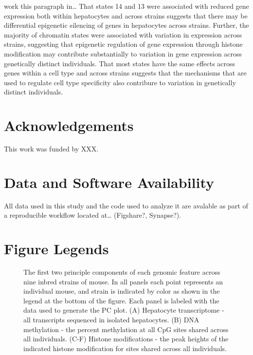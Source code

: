 \documentclass[10pt,letterpaper]{article}
\begin{document}
work this paragraph in\ldots{} That states 14 and 13 were associated
with reduced gene expression both within hepatocytes and across strains
suggests that there may be differential epigenetic silencing of genes in
hepatocytes across strains. Further, the majority of chromatin states
were associated with variation in expression across strains, suggesting
that epigenetic regulation of gene expression through histone
modification may contribute substantially to variation in gene
expression across genetically distinct individuals. That most states
have the same effects across genes within a cell type and across strains
suggests that the mechanisms that are used to regulate cell type
specificity also contribure to variation in genetically distinct
individuals.

\hypertarget{acknowledgements}{%
\section{Acknowledgements}\label{acknowledgements}}

This work was funded by XXX.

\hypertarget{data-and-software-availability}{%
\section{Data and Software
Availability}\label{data-and-software-availability}}

All data used in this study and the code used to analyze it are avalable
as part of a reproducible workflow located at\ldots{} (Figshare?,
Synapse?).

\hypertarget{figure-legends}{%
\section{Figure Legends}\label{figure-legends}}

\begin{figure}[ht]
\centering
\caption{The first two principle components of each genomic feature across
nine inbred strains of mouse. In all panels each point represents
an individual mouse, and strain is indicated by color as shown in
the legend at the bottom of the figure. Each panel is labeled with
the data used to generate the PC plot. (A) Hepatocyte transcriptome - 
all transcripts sequenced in isolated hepatocytes. (B) DNA methylation - 
the percent methylation at all CpG sites shared across all individuals. 
(C-F) Histone modifications - the peak heights of the indicated histone
modification for sites shared across all individuals.}
\label{fig:pc_plots}
\end{figure}
\end{document}
